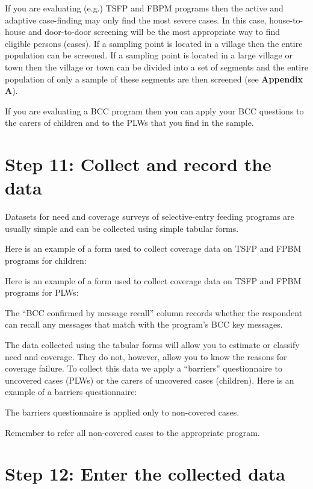 \documentclass[12pt,a4paper]{book}
\theoremstyle{definition}
\theoremstyle{definition}
\theoremstyle{definition}
\theoremstyle{remark}
\begin{document}
If you are evaluating (e.g.) TSFP and FBPM programs then the active and
adaptive case-finding may only find the most severe cases. In this case,
house-to-house and door-to-door screening will be the most appropriate
way to find eligible persons (cases). If a sampling point is located in
a village then the entire population can be screened. If a sampling
point is located in a large village or town then the village or town can
be divided into a set of segments and the entire population of only a
sample of these segments are then screened (see \textbf{Appendix A}).

If you are evaluating a BCC program then you can apply your BCC
questions to the carers of children and to the PLWs that you find in the
sample.

\newpage

\hypertarget{step-11-collect-and-record-the-data}{%
\section{Step 11: Collect and record the
data}\label{step-11-collect-and-record-the-data}}

Datasets for need and coverage surveys of selective-entry feeding
programs are usually simple and can be collected using simple tabular
forms.

Here is an example of a form used to collect coverage data on TSFP and
FPBM programs for children:

Here is an example of a form used to collect coverage data on TSFP and
FPBM programs for PLWs:

The ``BCC confirmed by message recall'' column records whether the
respondent can recall any messages that match with the program's BCC key
messages.

The data collected using the tabular forms will allow you to estimate or
classify need and coverage. They do not, however, allow you to know the
reasons for coverage failure. To collect this data we apply a
``barriers'' questionnaire to uncovered cases (PLWs) or the carers of
uncovered cases (children). Here is an example of a barriers
questionnaire:

The barriers questionnaire is applied only to non-covered cases.

Remember to refer all non-covered cases to the appropriate program.

\newpage

\hypertarget{step-12-enter-the-collected-data}{%
\section{Step 12: Enter the collected
data}\label{step-12-enter-the-collected-data}}
\end{document}
